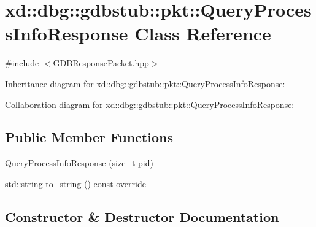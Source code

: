 \hypertarget{classxd_1_1dbg_1_1gdbstub_1_1pkt_1_1_query_process_info_response}{}\section{xd\+:\+:dbg\+:\+:gdbstub\+:\+:pkt\+:\+:Query\+Process\+Info\+Response Class Reference}
\label{classxd_1_1dbg_1_1gdbstub_1_1pkt_1_1_query_process_info_response}


{\ttfamily \#include $<$G\+D\+B\+Response\+Packet.\+hpp$>$}



Inheritance diagram for xd\+:\+:dbg\+:\+:gdbstub\+:\+:pkt\+:\+:Query\+Process\+Info\+Response\+:


Collaboration diagram for xd\+:\+:dbg\+:\+:gdbstub\+:\+:pkt\+:\+:Query\+Process\+Info\+Response\+:
\subsection*{Public Member Functions}
\begin{DoxyCompactItemize}
\item 
\mbox{\hyperlink{classxd_1_1dbg_1_1gdbstub_1_1pkt_1_1_query_process_info_response_a3b10de1309925c4af4da1ff764cdcf9e}{Query\+Process\+Info\+Response}} (size\+\_\+t pid)
\item 
std\+::string \mbox{\hyperlink{classxd_1_1dbg_1_1gdbstub_1_1pkt_1_1_query_process_info_response_a7ef463878fed6534fd3f88b4c3c30b17}{to\+\_\+string}} () const override
\end{DoxyCompactItemize}


\subsection{Constructor \& Destructor Documentation}
\mbox{\label{classxd_1_1dbg_1_1gdbstub_1_1pkt_1_1_query_process_info_response_a3b10de1309925c4af4da1ff764cdcf9e}} 

